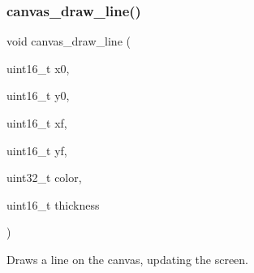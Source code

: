 \subsubsection{\texorpdfstring{canvas\+\_\+draw\+\_\+line()}{canvas\_draw\_line()}}
{\footnotesize\ttfamily void canvas\+\_\+draw\+\_\+line (\begin{DoxyParamCaption}\item[{uint16\+\_\+t}]{x0,  }\item[{uint16\+\_\+t}]{y0,  }\item[{uint16\+\_\+t}]{xf,  }\item[{uint16\+\_\+t}]{yf,  }\item[{uint32\+\_\+t}]{color,  }\item[{uint16\+\_\+t}]{thickness }\end{DoxyParamCaption})}



Draws a line on the canvas, updating the screen. 


